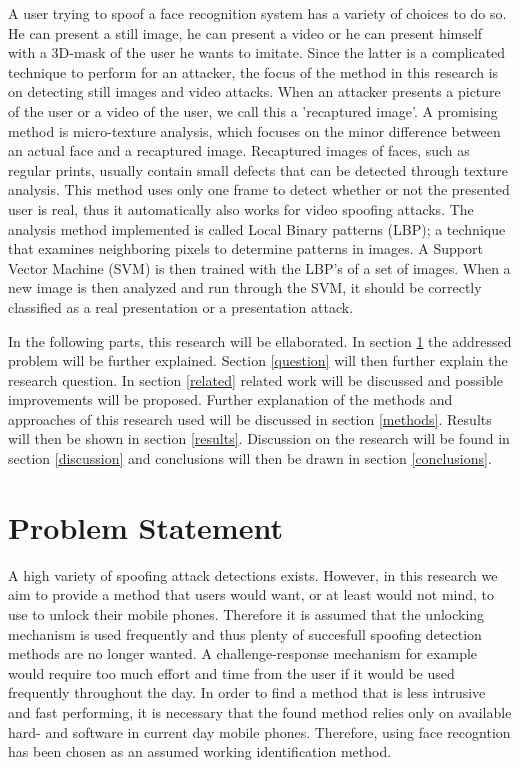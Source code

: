\documentclass{sig-alternate-br}
\begin{document}
A user trying to spoof a face recognition system has a variety of choices to do so. He can present a still image, he can present a video or he can present himself with a 3D-mask of the user he wants to imitate. Since the latter is a complicated technique to perform for an attacker, the focus of the method in this research is on detecting still images and video attacks. When an attacker presents a picture of the user or a video of the user, we call this a 'recaptured image'. A promising method is micro-texture analysis, which focuses on the minor difference between an actual face and a recaptured image. Recaptured images of faces, such as regular prints, usually contain small defects that can be detected through texture analysis. This method uses only one frame to detect whether or not the presented user is real, thus it automatically also works for video spoofing attacks. The analysis method implemented is called Local Binary patterns (LBP); a technique that examines neighboring pixels to determine patterns in images. A Support Vector Machine (SVM) is then trained with the LBP's of a set of images. When a new image is then analyzed and run through the SVM, it should be correctly classified as a real presentation or a presentation attack.

In the following parts, this research will be ellaborated. In section \ref{problem} the addressed problem will be further explained. Section \ref{question} will then further explain the research question. In section \ref{related} related work will be discussed and possible improvements will be proposed. Further explanation of the methods and approaches of this research used will be discussed in section \ref{methods}. Results will then be shown in section \ref{results}. Discussion on the research will be found in section \ref{discussion} and conclusions will then be drawn in section \ref{conclusions}.

\section{Problem Statement} \label{problem}
A high variety of spoofing attack detections exists. However, in this research we aim to provide a method that users would want, or at least would not mind, to use to unlock their mobile phones. Therefore it is assumed that the unlocking mechanism is used frequently and thus plenty of succesfull spoofing detection methods are no longer wanted. A challenge-response mechanism for example would require too much effort and time from the user if it would be used frequently throughout the day. In order to find a method that is less intrusive and fast performing, it is necessary that the found method relies only on available hard- and software in current day mobile phones. Therefore, using face recogntion has been chosen as an assumed working identification method.
\end{document}
